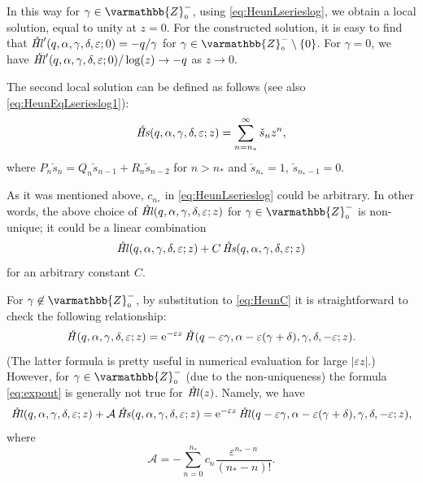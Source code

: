\documentclass[11pt]{article}
\newcommand{\MF}[1]{\mathop{#1}\nolimits}
\newcommand{\Zzo}{\varmathbb{Z}_{\scriptscriptstyle0}^{-}}%
\def\nsp{n_*}%
\def\HeunC{\displaystyle\setbox0=\hbox{\tiny\itshape\bfseries \kern1.52mm c}\wd0=0pt\ht0=0pt\dp0=0pt\MF{\textit{\hbox{\raise1.67ex\copy0}H\/}}}%
\def\HeunCl{\setbox0=\hbox{\tiny\itshape\bfseries \kern1.52mm c}\wd0=0pt\ht0=0pt\dp0=0pt\MF{\textit{\hbox{\raise1.67ex\copy0}Hl\/}}}%
\def\HeunCs{\setbox0=\hbox{\tiny\itshape\bfseries \kern1.52mm c}\wd0=0pt\ht0=0pt\dp0=0pt\MF{\textit{\hbox{\raise1.67ex\copy0}Hs\/}}}%
\begin{document}
In this way for $\gamma\in\Zzo$, using \eqref{eq:HeunLserieslog},  we
obtain a local solution, equal to unity at $z=0$. 
For the constructed solution, it is easy to find that 
$\HeunCl'(q,\alpha,\gamma,\delta,\varepsilon;0)=-q/\gamma$  for $\gamma\in\Zzo\setminus\{0\}$. For $\gamma=0$, we have
$\HeunCl'(q,\alpha,\gamma,\delta,\varepsilon;0)/\log(z)\to-q$ as $z\to0$.

\begin{samepage}
The second
local solution can be defined as follows (see also
\eqref{eq:HeunEqLserieslog1}):
\begin{equation}
  \HeunCs(q,\alpha,\gamma,\delta,\varepsilon;z)=\sum_{n=\nsp}^{\infty}\check{s}_n z^n,
\label{eq:HeunSsergammanonpositive}
\end{equation}
where $P_n \check{s}_n=Q_n \check{s}_{n-1}+R_n \check{s}_{n-2}$ for $n>\nsp$ and
$\check{s}_{\nsp}=1$, $\check{s}_{\nsp-1}=0$. 

\end{samepage}

As it was mentioned above, $c_{\nsp}$ in \eqref{eq:HeunLserieslog} could be arbitrary. In other
words, the above choice of $\HeunCl(q,\alpha,\gamma,\delta,\varepsilon;z)$ for
$\gamma\in\Zzo$ is non-unique; it could be a linear combination
\begin{equation*}
  \HeunCl(q,\alpha,\gamma,\delta,\varepsilon;z)+C\HeunCs(q,\alpha,\gamma,\delta,\varepsilon;z)
\label{eq:lincomb}
\end{equation*}
for an arbitrary constant $C$.

For $\gamma\not\in\Zzo$, by substitution to \eqref{eq:HeunC} it is straightforward to check the following relationship:
\begin{equation}
\HeunC(q,\alpha,\gamma,\delta,\varepsilon;z)=\E{-\varepsilon z}\HeunC(q-\varepsilon\gamma,\alpha-\varepsilon(\gamma+\delta),\gamma,\delta,-\varepsilon;z).
\label{eq:expout}
\end{equation}
(The latter formula is pretty useful in numerical evaluation for large $|\varepsilon z|$.) However, for $\gamma\in\Zzo$ (due to the non-uniqueness) the formula \eqref{eq:expout} is generally not true for $\HeunCl(z)$. Namely, we have 
\begin{equation}
\HeunCl(q,\alpha,\gamma,\delta,\varepsilon;z)+\mathcal{A}\HeunCs(q,\alpha,\gamma,\delta,\varepsilon;z)=\E{-\varepsilon z}\HeunCl(q-\varepsilon\gamma,\alpha-\varepsilon(\gamma+\delta),\gamma,\delta,-\varepsilon;z),
\label{eq:expout-mod}
\end{equation}
where
\[
\mathcal{A}=-\sum_{n=0}^{\nsp} c_n \frac{\varepsilon^{\nsp-n}}{(\nsp-n)!}.
\]
\end{document}
